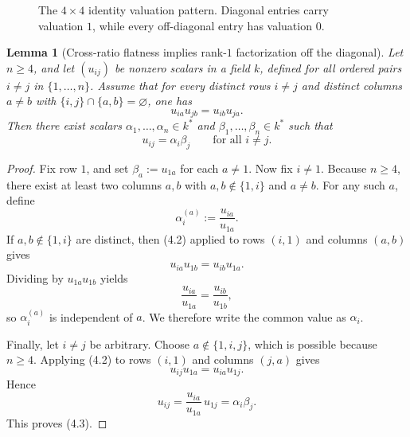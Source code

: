 \documentclass[11pt]{amsart}
\numberwithin{equation}{section}
\theoremstyle{plain}
\newtheorem{lemma}[theorem]{Lemma}
\theoremstyle{definition}
\theoremstyle{remark}
\begin{document}
\begin{figure}[htbp]
\centering
{}
\caption{The $4\times4$ identity valuation pattern. Diagonal entries carry valuation $1$, while every off-diagonal entry has valuation $0$.}
\label{fig:identity-pattern}
\end{figure}

\begin{lemma}[Cross-ratio flatness implies rank-$1$ factorization off the diagonal]
\label{lem:identity-flatness-rank1}
Let $n\ge 4$, and let $(u_{ij})$ be nonzero scalars in a field $k$, defined for all ordered pairs $i\neq j$ in $\{1,\dots,n\}$.
Assume that for every distinct rows $i\neq j$ and distinct columns $a\neq b$ with $\{i,j\}\cap\{a,b\}=\varnothing$, one has
\[
 u_{ia}u_{jb}=u_{ib}u_{ja}.
\tag{4.2}
\]
Then there exist scalars $\alpha_1,\dots,\alpha_n\in k^*$ and $\beta_1,\dots,\beta_n\in k^*$ such that
\[
 u_{ij}=\alpha_i\beta_j
 \qquad\text{for all } i\neq j.
\tag{4.3}
\]
\end{lemma}

\begin{proof}
Fix row $1$, and set $\beta_a:=u_{1a}$ for each $a\neq 1$.
Now fix $i\neq 1$.
Because $n\ge 4$, there exist at least two columns $a,b$ with $a,b\notin\{1,i\}$ and $a\neq b$.
For any such $a$, define
\[
\alpha_i^{(a)}:=\frac{u_{ia}}{u_{1a}}.
\]
If $a,b\notin\{1,i\}$ are distinct, then \textup{(4.2)} applied to rows $(i,1)$ and columns $(a,b)$ gives
\[
 u_{ia}u_{1b}=u_{ib}u_{1a}.
\]
Dividing by $u_{1a}u_{1b}$ yields
\[
 \frac{u_{ia}}{u_{1a}}=\frac{u_{ib}}{u_{1b}},
\]
so $\alpha_i^{(a)}$ is independent of $a$.
We therefore write the common value as $\alpha_i$.

Finally, let $i\neq j$ be arbitrary.
Choose $a\notin\{1,i,j\}$, which is possible because $n\ge 4$.
Applying \textup{(4.2)} to rows $(i,1)$ and columns $(j,a)$ gives
\[
 u_{ij}u_{1a}=u_{ia}u_{1j}.
\]
Hence
\[
 u_{ij}=\frac{u_{ia}}{u_{1a}}\,u_{1j}=\alpha_i\beta_j.
\]
This proves \textup{(4.3)}.
\end{proof}
\end{document}
